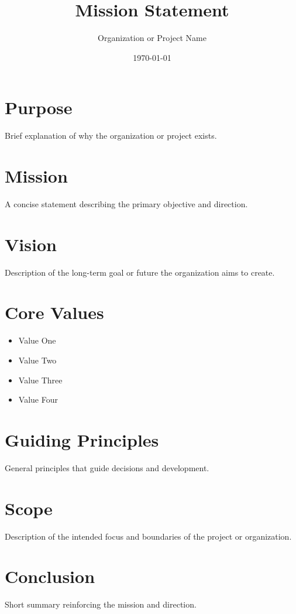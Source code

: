 \documentclass[11pt]{article}
\title{Mission Statement}
\author{Organization or Project Name}
\date{\today}
\begin{document}
\maketitle
\thispagestyle{empty}

\newpage
\tableofcontents
\newpage

\section{Purpose}

Brief explanation of why the organization or project exists.

\section{Mission}

A concise statement describing the primary objective and direction.

\section{Vision}

Description of the long-term goal or future the organization aims to create.

\section{Core Values}

\begin{itemize}
\item Value One
\item Value Two
\item Value Three
\item Value Four
\end{itemize}

\section{Guiding Principles}

General principles that guide decisions and development.

\section{Scope}

Description of the intended focus and boundaries of the project or organization.

\section{Conclusion}

Short summary reinforcing the mission and direction.
\end{document}
